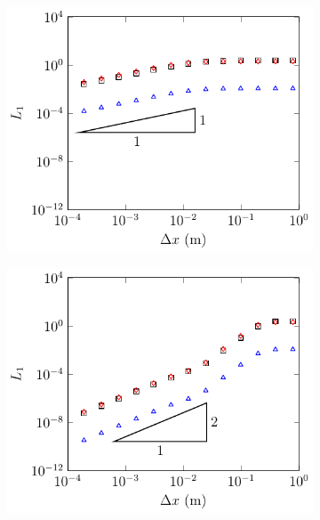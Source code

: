 \begin{figure}
	\centering
	\begin{subfigure}{0.5\textwidth}
		\includegraphics[width=\textwidth]{./chp5/figures/Analytic/Soliton/L1/FDVM1.pdf}
		\vspace{0.5cm}
	\end{subfigure}%
	\begin{subfigure}{0.5\textwidth}
		\includegraphics[width=\textwidth]{./chp5/figures/Analytic/Soliton/L1/FDVM2.pdf}
		\vspace{0.5cm}
	\end{subfigure}

\end{figure}
